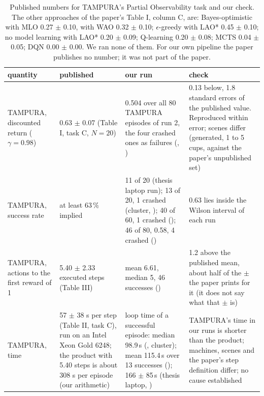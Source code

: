 \begin{table}[tbp]
\centering
\small
\begin{tabularx}{\textwidth}{@{}P{2.9cm}YYY@{}}
\toprule
quantity & published \cite{curtis2024partially} & our run & check \\
\midrule
TAMPURA, discounted return ($\gamma = 0.98$) & 0.63 $\pm$ 0.07 (Table I, task C, $N = 20$) & 0.504 over all 80 TAMPURA episodes of run 2, the four crashed ones as failures (, ) & 0.13 below, 1.8 standard errors of the published value. Reproduced within error; scenes differ (generated, 1 to 5 cups, against the paper's unpublished set) \\
TAMPURA, success rate & at least 63\,\% implied & 11 of 20 (thesis laptop run); 13 of 20, 1 crashed (cluster, ); 40 of 60, 1 crashed (); 46 of 80, 0.58, 4 crashed () & 0.63 lies inside the Wilson interval of each run \\
TAMPURA, actions to the first reward of 1 & 5.40 $\pm$ 2.33 executed steps (Table III) & mean 6.61, median 5, 46 successes () & 1.2 above the published mean, about half of the $\pm$ the paper prints for it (it does not say what that $\pm$ is) \\
TAMPURA, time & 57 $\pm$ 38 s per step (Table II, task C), run on an Intel Xeon Gold 6248; the product with 5.40 steps is about 308 s per episode (our arithmetic) & loop time of a successful episode: median 98.9\,s (, cluster); mean 115.4\,s over 13 successes (); 166 $\pm$ 85\,s (thesis laptop, ) & TAMPURA's time in our runs is shorter than the product; machines, scenes and the paper's step definition differ; no cause established \\
\bottomrule
\end{tabularx}
\caption[Published numbers for TAMPURA's Partial Observability task and our check.]{Published
numbers for TAMPURA's Partial Observability task and our check. The other approaches of the paper's Table I, column C, are: Bayes-optimistic with
MLO 0.27 $\pm$ 0.10, with WAO 0.32 $\pm$ 0.10; $\epsilon$-greedy with LAO*
0.45 $\pm$ 0.10; no model learning with LAO* 0.20 $\pm$ 0.09; Q-learning 0.20
$\pm$ 0.08; MCTS 0.04 $\pm$ 0.05; DQN 0.00 $\pm$ 0.00. We ran none of them. For our
own pipeline the paper publishes no number; it was not part of the paper.}
\label{tab:published-fd}
\end{table}

